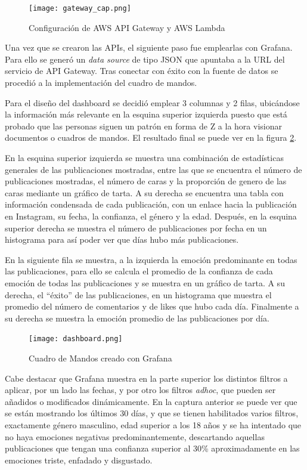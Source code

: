 \begin{figure}[H]
    \hspace*{-2cm}
    \centering
    \texttt{[image: gateway\_cap.png]}
    \caption{Configuración de AWS API Gateway y AWS Lambda}
    \label{fig:gateway_cap}
\end{figure}

Una vez que se crearon las APIs, el siguiente paso fue emplearlas con Grafana. Para ello se generó un \textit{data source} de tipo JSON que apuntaba a la URL del servicio de API Gateway. Tras conectar con éxito con la fuente de datos se procedió a la implementación del cuadro de mandos.

Para el diseño del dashboard se decidió emplear 3 columnas y 2 filas, ubicándose la información más relevante en la esquina superior izquierda puesto que está probado que las personas siguen un patrón en forma de Z a la hora visionar documentos o cuadros de mandos. El resultado final se puede ver en la figura \ref{fig:dashboard}.

En la esquina superior izquierda se muestra una combinación de estadísticas generales de las publicaciones mostradas, entre las que se encuentra el número de publicaciones mostradas, el número de caras y la proporción de genero de las caras mediante un gráfico de tarta. A su derecha se encuentra una tabla con información condensada de cada publicación, con un enlace hacia la publicación en Instagram, su fecha, la confianza, el género y la edad. Después, en la esquina superior derecha se muestra el número de publicaciones por fecha en un histograma para así poder ver que días hubo más publicaciones.

En la siguiente fila se muestra, a la izquierda la emoción predominante en todas las publicaciones, para ello se calcula el promedio de la confianza de cada emoción de todas las publicaciones y se muestra en un gráfico de tarta. A su derecha, el ``éxito'' de las publicaciones, en un histograma que muestra el promedio del número de comentarios y de likes que hubo cada día. Finalmente a su derecha se muestra la emoción promedio de las publicaciones por día.

\begin{figure}[H]
    \hspace*{-1.5cm}
    \centering
    \texttt{[image: dashboard.png]}
    \caption{Cuadro de Mandos creado con Grafana}
    \label{fig:dashboard}
\end{figure}

Cabe destacar que Grafana muestra en la parte superior los distintos filtros a aplicar, por un lado las fechas, y por otro los filtros \textit{adhoc}, que pueden ser añadidos o modificados dinámicamente. En la captura anterior se puede ver que se están mostrando los últimos 30 días, y que se tienen habilitados varios filtros, exactamente género masculino, edad superior a los 18 años y se ha intentado que no haya emociones negativas predominantemente, descartando aquellas publicaciones que tengan una confianza superior al 30\% aproximadamente en las emociones triste, enfadado y disgustado.

